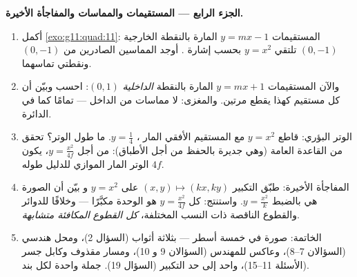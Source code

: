 \begin{problem}
\medskip
\noindent\textbf{الجزء الرابع --- المستقيمات والمماسات والمفاجأة
الأخيرة.}
\begin{enumerate}[resume]
  \item أكمل \cref{exo:g11:quad:11}: المستقيمات
        $y = mx - 1$ المارة بالنقطة الخارجية $(0, -1)$ تلتقي
        $y = x^2$ بحسب إشارة .
        أوجد المماسين الصادرين من $(0, -1)$ ونقطتي
        تماسهما.
  \item والآن المستقيمات $y = mx + 1$ المارة بالنقطة \emph{الداخلية}
        $(0, 1)$: احسب  
         وبيّن أن كل مستقيم كهذا يقطع
         مرتين. والمغزى: لا مماسات من الداخل ---
        تمامًا كما في الدائرة.
  \item الوتر البؤري: قاطع $y = x^2$ مع
        المستقيم الأفقي المار ، $y = \frac14$. ما
        طول الوتر؟ تحقق من القاعدة العامة (وهي جديرة
        بالحفظ من أجل الأطباق): من أجل $y = \frac{x^2}{4f}$، يكون
        الوتر المار  الموازي للدليل
        طوله $4f$.
  \item المفاجأة الأخيرة: طبّق التكبير
        $(x, y) \mapsto (kx, ky)$ على  $y = x^2$ و
        بيّن أن الصورة هي بالضبط $y = \frac{x^2}{k}$. واستنتج:
        كل  $y = \frac{x^2}{4f}$ هو  الوحدة
        مكبَّرًا --- وخلافًا للدوائر والقطوع الناقصة ذات النسب
        المختلفة، \emph{كل القطوع المكافئة متشابهة}.
  \item الخاتمة: صورة  في خمسة أسطر --- 
        بثلاثة أثواب (السؤال 2)، ومحل هندسي
        (السؤالان 7--8)، وعاكس للمهندس (السؤالان 9
        و 10)، ومسار مقذوف وكابل جسر
        (الأسئلة 11--15)،  واحد إلى حد التكبير
        (السؤال 19). جملة واحدة لكل بند.
\end{enumerate}
\end{problem}
